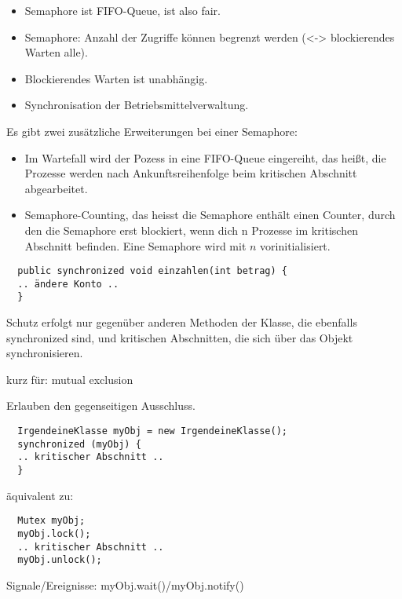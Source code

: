 \begin{answer}
\begin{itemize}

  \item Semaphore ist FIFO-Queue, ist also fair.

  \item Semaphore: Anzahl der Zugriffe können begrenzt werden (<-> blockierendes Warten alle).

  \item Blockierendes Warten ist unabhängig.

  \item Synchronisation der Betriebsmittelverwaltung.
\end{itemize}

Es gibt zwei zusätzliche Erweiterungen bei einer Semaphore:

\begin{itemize}

  \item Im Wartefall wird der Pozess in eine FIFO-Queue eingereiht, das heißt, die Prozesse werden nach Ankunftsreihenfolge beim kritischen Abschnitt abgearbeitet.

  \item Semaphore-Counting, das heisst die Semaphore enthält einen Counter, durch den die Semaphore erst blockiert, wenn dich n Prozesse im kritischen Abschnitt befinden. Eine Semaphore wird mit $n$ vorinitialisiert.

\end{itemize}
\end{answer}

\begin{answer}
\begin{verbatim}
  public synchronized void einzahlen(int betrag) {
  .. ändere Konto ..
  }
\end{verbatim}

Schutz erfolgt nur gegenüber anderen Methoden der Klasse, die ebenfalls synchronized sind, und kritischen Abschnitten, die sich über das Objekt synchronisieren.
\end{answer}

\begin{answer}
kurz für: mutual exclusion

Erlauben den gegenseitigen Ausschluss.

\begin{verbatim}
  IrgendeineKlasse myObj = new IrgendeineKlasse();
  synchronized (myObj) {
  .. kritischer Abschnitt ..
  }
\end{verbatim}

äquivalent zu:

\begin{verbatim}
  Mutex myObj;
  myObj.lock();
  .. kritischer Abschnitt ..
  myObj.unlock();
\end{verbatim}

Signale/Ereignisse: myObj.wait()/myObj.notify()
\end{answer}



